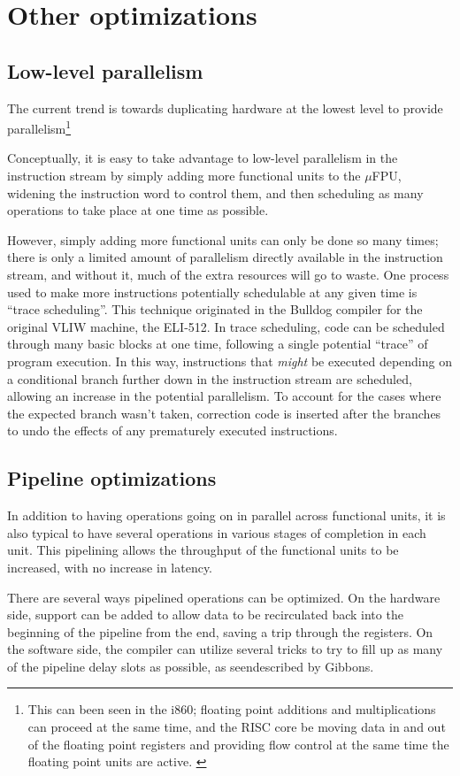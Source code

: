 \section{Other optimizations}

\subsection{Low-level parallelism}

The current trend is towards duplicating hardware at the lowest level to
provide parallelism\footnote{This can been seen in the i860; floating point
additions and multiplications can proceed at the same time, and the RISC
core be moving data in and out of the floating point registers and providing
flow control at the same time the floating point units are active. \cite{byte:i860}}

Conceptually, it is easy to take advantage to low-level parallelism in the
instruction stream by simply adding more functional units to the $\mu$FPU,
widening the instruction word to control them, and then scheduling as many
operations to take place at one time as possible.

However, simply adding more functional units can only be done so many times;
there is only a limited amount of parallelism directly available in the
instruction stream, and without it, much of the extra resources will go to
waste.  One process used to make more instructions potentially schedulable
at any given time is ``trace scheduling''.  This technique originated in the
Bulldog compiler for the original VLIW machine, the ELI-512.
\cite{ellis:bulldog,colwell:vliw}  In trace scheduling, code can be
scheduled through many basic blocks at one time, following a single
potential ``trace'' of program execution.  In this way, instructions that
{\em might\/} be executed depending on a conditional branch further down in
the instruction stream are scheduled, allowing an increase in the potential
parallelism.  To account for the cases where the expected branch wasn't
taken, correction code is inserted after the branches to undo the effects of
any prematurely executed instructions.

\subsection{Pipeline optimizations}

In addition to having operations going on in parallel across functional
units, it is also typical to have several operations in various stages of
completion in each unit.  This pipelining allows the throughput of the
functional units to be increased, with no increase in latency.

There are several ways pipelined operations can be optimized.  On the
hardware side, support can be added to allow data to be recirculated back
into the beginning of the pipeline from the end, saving a trip through the
registers.  On the software side, the compiler can utilize several tricks to
try to fill up as many of the pipeline delay slots as possible, as
seendescribed by Gibbons. \cite{gib86}


